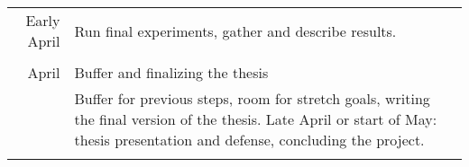 \begin{longtable}{r|p{9cm}}
   Early April & Run final experiments, gather and describe results. \\\multicolumn{2}{c}{} \\
 
    April & Buffer and finalizing the thesis \\
 &\footnotesize{Buffer for previous steps, room for stretch goals, writing the final version of the thesis. Late April or start of May: thesis presentation and defense, concluding the project.}\\\multicolumn{2}{c}{} \\
\end{longtable}
